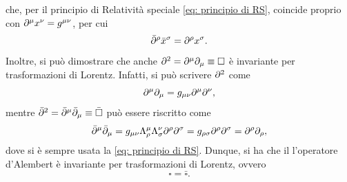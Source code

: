 che, per il principio di Relatività speciale \eqref{eq: principio di RS}, coincide proprio con $\partial^\mu x^\nu = g^{\mu\nu}$, per cui
\begin{equation}
    \bar{\partial}^\rho\bar{x}^\sigma = \partial^\rho x^\sigma.
\end{equation}
Inoltre, si può dimostrare che anche $\partial^2 = \partial^\mu\partial_\mu \equiv\square$ è invariante per trasformazioni di Lorentz. Infatti, si può scrivere $\partial^2$ come
\begin{equation}
    \partial^\mu\partial_\mu = g_{\mu\nu}\partial^\mu\partial^\nu,
\end{equation}
mentre $\bar{\partial}^2 = \bar{\partial}^\mu\bar{\partial}_\mu \equiv \bar{\square}$ può essere riscritto come
\begin{equation}
    \bar{\partial}^\mu\bar{\partial}_\mu = g_{\mu\nu}\Lambda^\mu_\rho\Lambda^\nu_\sigma\partial^\rho\partial^\sigma = g_{\rho\sigma}\partial^\rho\partial^\sigma = \partial^\rho\partial_\rho,
\end{equation}
dove si è sempre usata la \eqref{eq: principio di RS}. Dunque, si ha che il l'operatore d'Alembert è invariante per trasformazioni di Lorentz, ovvero
\begin{equation}
\label{eq: invarianza per TdL di OD'AL}
    \square = \bar{\square}.
\end{equation}

